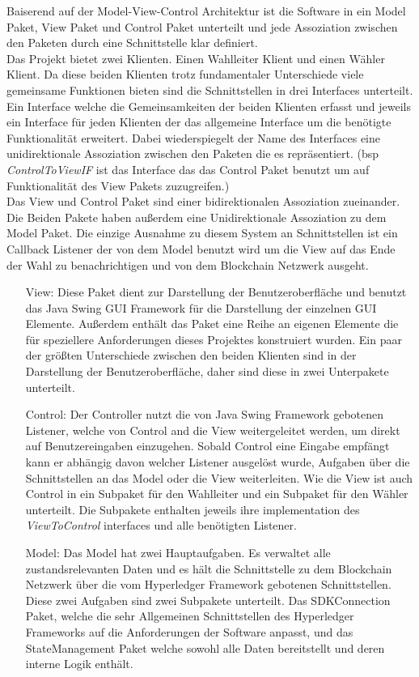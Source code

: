 \documentclass[parskip=full]{scrartcl}
\begin{document}
	Baiserend auf der Model-View-Control Architektur ist die Software in ein Model Paket, View Paket und Control Paket unterteilt und jede Assoziation zwischen den Paketen durch eine Schnittstelle klar definiert. 
	\\
	Das Projekt bietet zwei Klienten. Einen Wahlleiter Klient und einen Wähler Klient. Da diese beiden Klienten trotz fundamentaler Unterschiede viele gemeinsame Funktionen bieten sind die Schnittstellen in drei Interfaces unterteilt. Ein Interface welche die Gemeinsamkeiten der beiden Klienten erfasst und jeweils ein Interface für jeden Klienten der das allgemeine Interface um die benötigte Funktionalität erweitert. Dabei wiederspiegelt der Name des Interfaces eine unidirektionale Assoziation zwischen den Paketen die es repräsentiert. (bsp \textit{ControlToViewIF} ist das Interface das das Control Paket benutzt um auf Funktionalität des View Pakets zuzugreifen.)
	\\
	Das View und Control Paket sind einer bidirektionalen Assoziation zueinander. Die Beiden Pakete haben außerdem eine Unidirektionale Assoziation zu dem Model Paket. Die einzige Ausnahme zu diesem System an Schnittstellen ist ein Callback Listener der von dem Model benutzt wird um die View auf das Ende der Wahl zu benachrichtigen und von dem Blockchain Netzwerk ausgeht.
	\\
	\begin{itemize}
		\item[View:] Diese Paket dient zur Darstellung der Benutzeroberfläche und benutzt das Java Swing GUI Framework für die Darstellung der einzelnen GUI Elemente. Außerdem enthält das Paket eine Reihe an eigenen Elemente die für speziellere Anforderungen dieses Projektes konstruiert wurden. Ein paar der größten Unterschiede zwischen den beiden Klienten sind in der Darstellung der Benutzeroberfläche, daher sind diese in zwei Unterpakete unterteilt.
		\item[Control:] Der Controller nutzt die von Java Swing Framework gebotenen Listener, welche von Control and die View weitergeleitet werden, um direkt auf Benutzereingaben einzugehen. Sobald Control eine Eingabe empfängt kann er abhängig davon welcher Listener ausgelöst wurde, Aufgaben über die Schnittstellen an das Model oder die View weiterleiten. Wie die View ist auch Control in ein Subpaket für den Wahlleiter und ein Subpaket für den Wähler unterteilt. Die Subpakete enthalten jeweils ihre implementation des \textit{ViewToControl} interfaces und alle benötigten Listener.
		\item[Model:] Das Model hat zwei Hauptaufgaben. Es verwaltet alle zustandsrelevanten Daten und es hält die Schnittstelle zu dem Blockchain Netzwerk über die vom Hyperledger Framework gebotenen Schnittstellen. Diese zwei Aufgaben sind zwei Subpakete unterteilt. Das SDKConnection Paket, welche die sehr Allgemeinen Schnittstellen des Hyperledger Frameworks auf die Anforderungen der Software anpasst, und das StateManagement Paket welche sowohl alle Daten bereitstellt und deren interne Logik enthält.   
	\end{itemize} 
\end{document}
